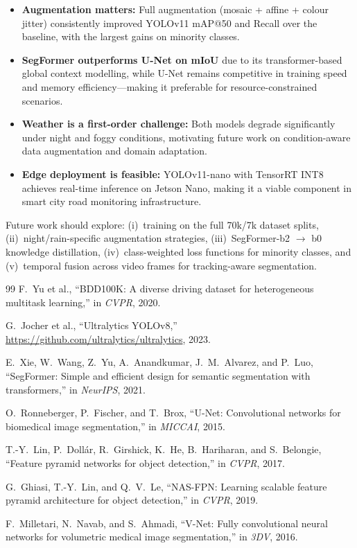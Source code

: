 \documentclass[10pt,twocolumn]{article}
\begin{document}
\begin{itemize}
  \item \textbf{Augmentation matters:} Full augmentation (mosaic + affine +
        colour jitter) consistently improved YOLOv11 mAP@50 and Recall over the
        baseline, with the largest gains on minority classes.
  \item \textbf{SegFormer outperforms U-Net on mIoU} due to its
        transformer-based global context modelling, while U-Net remains
        competitive in training speed and memory efficiency---making it
        preferable for resource-constrained scenarios.
  \item \textbf{Weather is a first-order challenge:} Both models degrade
        significantly under night and foggy conditions, motivating future work
        on condition-aware data augmentation and domain adaptation.
  \item \textbf{Edge deployment is feasible:} YOLOv11-nano with TensorRT INT8
        achieves real-time inference on Jetson Nano, making it a viable
        component in smart city road monitoring infrastructure.
\end{itemize}

Future work should explore: (i)~training on the full 70k/7k dataset splits,
(ii)~night/rain-specific augmentation strategies,
(iii)~SegFormer-b2 $\to$ b0 knowledge distillation,
(iv)~class-weighted loss functions for minority classes, and
(v)~temporal fusion across video frames for tracking-aware segmentation.

\begin{thebibliography}{99}
\small
{}
F.~Yu et al., ``BDD100K: A diverse driving dataset for heterogeneous
multitask learning,'' in \emph{CVPR}, 2020.

G.~Jocher et al., ``Ultralytics YOLOv8,'' \url{https://github.com/ultralytics/ultralytics}, 2023.

E.~Xie, W.~Wang, Z.~Yu, A.~Anandkumar, J.~M.~Alvarez, and P.~Luo,
``SegFormer: Simple and efficient design for semantic segmentation with
transformers,'' in \emph{NeurIPS}, 2021.

O.~Ronneberger, P.~Fischer, and T.~Brox,
``U-Net: Convolutional networks for biomedical image segmentation,''
in \emph{MICCAI}, 2015.

T.-Y.~Lin, P.~Doll\'ar, R.~Girshick, K.~He, B.~Hariharan, and S.~Belongie,
``Feature pyramid networks for object detection,'' in \emph{CVPR}, 2017.

G.~Ghiasi, T.-Y.~Lin, and Q.~V.~Le,
``NAS-FPN: Learning scalable feature pyramid architecture for object detection,''
in \emph{CVPR}, 2019.

F.~Milletari, N.~Navab, and S.~Ahmadi,
``V-Net: Fully convolutional neural networks for volumetric medical image
segmentation,'' in \emph{3DV}, 2016.
\end{thebibliography}
\end{document}

